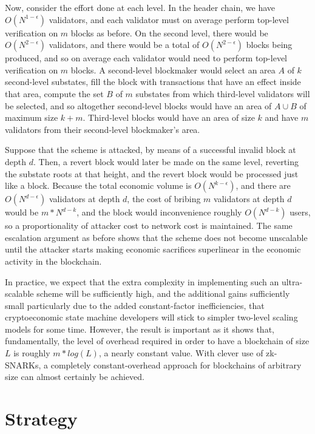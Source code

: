 \documentclass[11pt,a4paper]{report}
\theoremstyle{plain}
\theoremstyle{definition}
\theoremstyle{remark}
\begin{document}
Now, consider the effort done at each level. In the header chain, we have $O(N^{1-\epsilon})$ validators, and each validator must on average perform top-level verification on $m$ blocks as before. On the second level, there would be $O(N^{2-\epsilon})$ validators, and there would be a total of $O(N^{2-\epsilon})$ blocks being produced, and so on average each validator would need to perform top-level verification on $m$ blocks. A second-level blockmaker would select an area $A$ of $k$ second-level substates, fill the block with transactions that have an effect inside that area, compute the set $B$ of $m$ substates from which third-level validators will be selected, and so altogether second-level blocks would have an area of $A \cup B$ of maximum size $k + m$. Third-level blocks would have an area of size $k$ and have $m$ validators from their second-level blockmaker's area.

Suppose that the scheme is attacked, by means of a successful invalid block at depth $d$. Then, a revert block would later be made on the same level, reverting the substate roots at that height, and the revert block would be processed just like a block. Because the total economic volume is $O(N^{k-\epsilon})$, and there are $O(N^{d-\epsilon})$ validators at depth $d$, the cost of bribing $m$ validators at depth $d$ would be $m * N^{d - k}$, and the block would inconvenience roughly $O(N^{d - k})$ users, so a proportionality of attacker cost to network cost is maintained. The same escalation argument as before shows that the scheme does not become unscalable until the attacker starts making economic sacrifices superlinear in the economic activity in the blockchain.

In practice, we expect that the extra complexity in implementing such an ultra-scalable scheme will be sufficiently high, and the additional gains sufficiently small particularly due to the added constant-factor inefficiencies, that cryptoeconomic state machine developers will stick to simpler two-level scaling models for some time. However, the result is important as it shows that, fundamentally, the level of overhead required in order to have a blockchain of size $L$ is roughly $m * log(L)$, a nearly constant value. With clever use of zk-SNARKs, a completely constant-overhead approach for blockchains of arbitrary size can almost certainly be achieved.

\chapter{Strategy}
\end{document}
